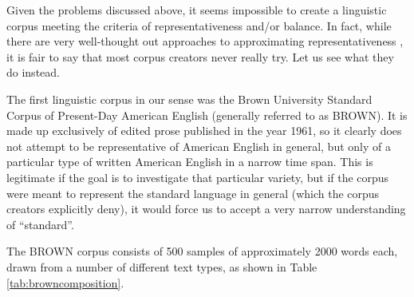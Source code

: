 Given the problems discussed above, it seems impossible to create a linguistic corpus meeting the criteria of representativeness and/or balance. In fact, while there are very well-thought out approaches to approximating representativeness \citep[cf., e.g., ][]{biber_representativeness_1993}, it is fair to say that most corpus creators never really try. Let us see what they do instead.

The first linguistic corpus in our sense was the Brown University Standard Corpus of Present-Day American English (generally referred to as BROWN). It is made up exclusively of edited prose published in the year 1961, so it clearly does not attempt to be representative of American English in general, but only of a particular type of written American English in a narrow time span. This is legitimate if the goal is to investigate that particular variety, but if the corpus were meant to represent the standard language in general (which the corpus creators explicitly deny), it would force us to accept a very narrow understanding of ``standard''.

The BROWN corpus consists of 500 samples of approximately 2000 words each, drawn from a number of different text types, as shown in Table \ref{tab:browncomposition}.

